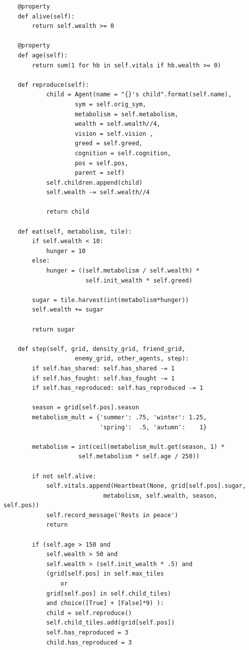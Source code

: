 \begin{verbatim}
    @property
    def alive(self):
        return self.wealth >= 0
    
    @property
    def age(self):
        return sum(1 for hb in self.vitals if hb.wealth >= 0)
    
    def reproduce(self):
            child = Agent(name = "{}'s child".format(self.name),
                    sym = self.orig_sym,
                    metabolism = self.metabolism,
                    wealth = self.wealth//4,
                    vision = self.vision ,
                    greed = self.greed,
                    cognition = self.cognition,
                    pos = self.pos,
                    parent = self)            
            self.children.append(child)
            self.wealth -= self.wealth//4 

            return child
    
    def eat(self, metabolism, tile):
        if self.wealth < 10:
            hunger = 10
        else:
            hunger = ((self.metabolism / self.wealth) * 
                       self.init_wealth * self.greed)
        
        sugar = tile.harvest(int(metabolism*hunger))
        self.wealth += sugar

        return sugar
    
    def step(self, grid, density_grid, friend_grid, 
                    enemy_grid, other_agents, step):
        if self.has_shared: self.has_shared -= 1
        if self.has_fought: self.has_fought -= 1
        if self.has_reproduced: self.has_reproduced -= 1
        
        season = grid[self.pos].season
        metabolism_mult = {'summer': .75, 'winter': 1.25, 
                           'spring':  .5, 'autumn':    1}
        
        metabolism = int(ceil(metabolism_mult.get(season, 1) *
                     self.metabolism * self.age / 250))
        
        if not self.alive:
            self.vitals.append(Heartbeat(None, grid[self.pos].sugar, 
                            metabolism, self.wealth, season, self.pos))
            self.record_message('Rests in peace')
            return
        
        if (self.age > 150 and
            self.wealth > 50 and
            self.wealth > (self.init_wealth * .5) and
            (grid[self.pos] in self.max_tiles
                or
            grid[self.pos] in self.child_tiles)
            and choice([True] + [False]*9) ):
            child = self.reproduce()
            self.child_tiles.add(grid[self.pos])
            self.has_reproduced = 3
            child.has_reproduced = 3
                

\end{verbatim}
